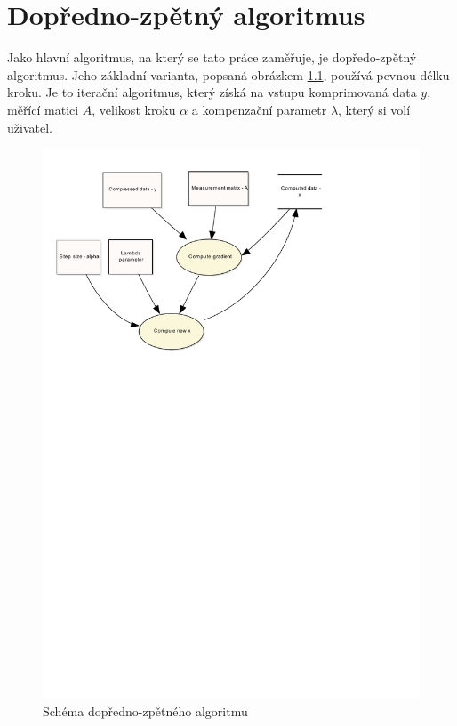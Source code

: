 \documentclass[FM,BP]{tulthesis}
\begin{document}
\chapter{Dopředno-zpětný algoritmus}
\label{ch:fwbw}
Jako hlavní algoritmus, na který se tato práce zaměřuje, je dopředo-zpětný algoritmus. Jeho základní varianta, popsaná obrázkem \ref{fig:fw-bw alg}, používá pevnou délku kroku. Je to iterační algoritmus, který získá na vstupu komprimovaná data $y$, měřící matici $A$, velikost kroku $\alpha$ a kompenzační parametr $\lambda$, který si volí uživatel.
\begin{figure}[!ht]
\begin{center}
\includegraphics[scale=0.7]{obr/forwardbackward.pdf}
\end{center}
\caption{Schéma dopředno-zpětného algoritmu}
\label{fig:fw-bw alg}
\end{figure}
\end{document}
